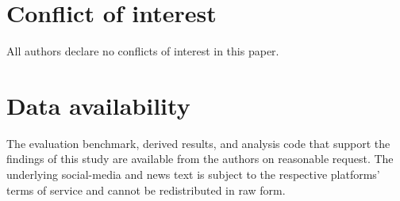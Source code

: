\documentclass{aims}
\numberwithin{equation}{section}
\begin{document}
\section*{Conflict of interest}
All authors declare no conflicts of interest in this paper.

\section*{Data availability}
The evaluation benchmark, derived results, and analysis code that support the
findings of this study are available from the authors on reasonable request. The
underlying social-media and news text is subject to the respective platforms' terms
of service and cannot be redistributed in raw form.


\providecommand{\href}[2]{#2}
\providecommand{\arxiv}[1]{\href{http://arxiv.org/abs/#1}{arXiv:#1}}
\providecommand{\url}[1]{\texttt{#1}}
\providecommand{\urlprefix}{URL }
\end{document}
